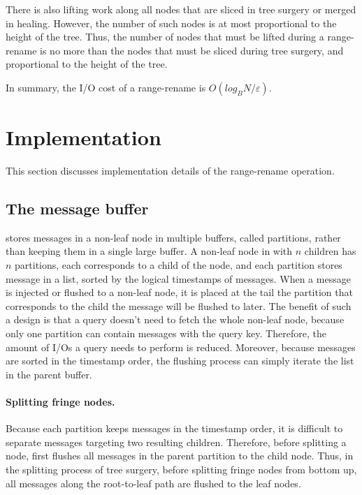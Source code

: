 There is also lifting work along all nodes that are sliced in tree surgery or
merged in healing.
However, the number of such nodes is at most proportional to the height of the
tree.
Thus, the number of nodes that must be lifted during a range-rename is no more
than the nodes that must be sliced during tree surgery, and proportional to
the height of the tree.

In summary, the I/O cost of a range-rename is $O(log_{B}{N}/\varepsilon)$.

\section{Implementation}
\label{sec:rrimp}

This section discusses implementation details of the range-rename operation.

\subsection{The message buffer}

\Fti stores messages in a non-leaf node in multiple buffers, called partitions,
rather than keeping them in a single large buffer.
A non-leaf node in \fti with $n$ children has $n$ partitions, each corresponds
to a child of the node, and each partition stores message in a list, sorted
by the logical timestamps of messages.
When a message is injected or flushed to a non-leaf node, it is placed at the
tail the partition
that corresponds to the child the message will be flushed to later.
The benefit of such a design is that a query doesn't need to fetch the whole
non-leaf node,
because only one partition can contain messages with the query key.
Therefore, the amount of I/Os a query needs to perform is reduced.
Moreover, because messages are sorted in the timestamp order, the flushing
process can simply iterate the list in the parent buffer.

\paragraph{Splitting fringe nodes.}
Because each partition keeps messages in the timestamp order, it is difficult
to separate messages targeting two resulting children.
Therefore, before splitting a node, \fti first flushes all messages in the
parent partition to the child node.
Thus, in the splitting process of tree surgery, before splitting fringe nodes
from bottom up, all messages along the root-to-leaf path are flushed to the
leaf nodes.

